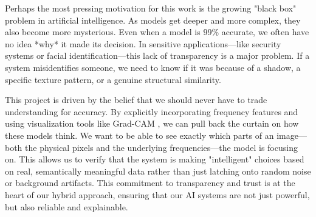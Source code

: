 Perhaps the most pressing motivation for this work is the growing "black box" problem in artificial intelligence. As models get deeper and more complex, they also become more mysterious. Even when a model is 99\% accurate, we often have no idea *why* it made its decision. In sensitive applications—like security systems or facial identification—this lack of transparency is a major problem. If a system misidentifies someone, we need to know if it was because of a shadow, a specific texture pattern, or a genuine structural similarity.

This project is driven by the belief that we should never have to trade understanding for accuracy. By explicitly incorporating frequency features and using visualization tools like Grad-CAM \cite{gradcam}, we can pull back the curtain on how these models think. We want to be able to see exactly which parts of an image—both the physical pixels and the underlying frequencies—the model is focusing on. This allows us to verify that the system is making "intelligent" choices based on real, semantically meaningful data rather than just latching onto random noise or background artifacts. This commitment to transparency and trust is at the heart of our hybrid approach, ensuring that our AI systems are not just powerful, but also reliable and explainable.

